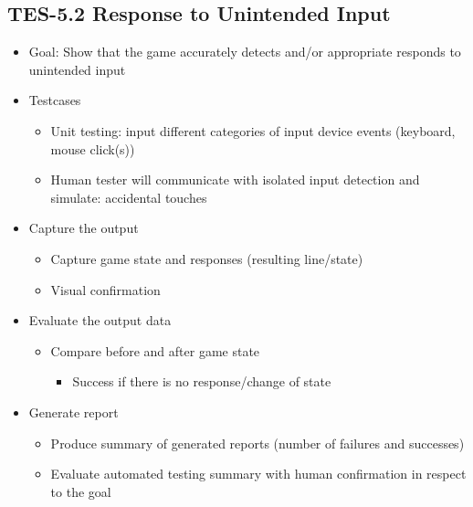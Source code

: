 \subsection{TES-5.2 Response to Unintended Input}
\begin{itemize}
\item Goal: Show that the game accurately detects and/or appropriate responds to unintended input

\item Testcases
\begin{itemize}
\item Unit testing: input different categories of input device events (keyboard, mouse click(s))
\item Human tester will communicate with isolated input detection and simulate: accidental touches
\end{itemize}

\item Capture the output
\begin{itemize}
\item Capture game state and responses (resulting line/state)
\item Visual confirmation
\end{itemize}

\item Evaluate the output data
\begin{itemize}
\item Compare before and after game state
\begin{itemize}
\item Success if there is no response/change of state
\end{itemize}
\end{itemize}

\item Generate report
\begin{itemize}
\item Produce summary of generated reports (number of failures and successes)
\item Evaluate automated testing summary with human confirmation in respect to the goal
\end{itemize}
\end{itemize}


